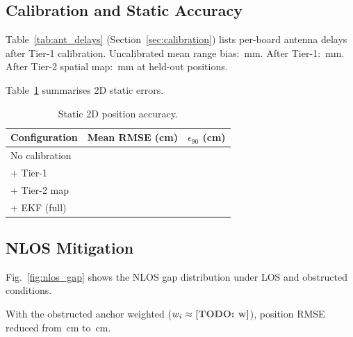 

\subsection{Calibration and Static Accuracy}

Table~\ref{tab:ant_delays} (Section~\ref{sec:calibration}) lists per-board
antenna delays after Tier-1 calibration.
Uncalibrated mean range bias: \,mm.
After Tier-1: \,mm.
After Tier-2 spatial map: \,mm at held-out positions.


Table~\ref{tab:static_accuracy} summarises 2D static errors.

\begin{table}[h]
  \centering
  \caption{Static 2D position accuracy.}
  \label{tab:static_accuracy}
  \begin{tabular}{lcc}
    \toprule
    Configuration & Mean RMSE (cm) & $\epsilon_{90}$ (cm) \\
    \midrule
    No calibration & \todo{} & \todo{} \\
    + Tier-1       & \todo{} & \todo{} \\
    + Tier-2 map   & \todo{} & \todo{} \\
    + EKF (full)   & \todo{} & \todo{} \\
    \bottomrule
  \end{tabular}
\end{table}

\subsection{NLOS Mitigation}

Fig.~\ref{fig:nlos_gap} shows the NLOS gap distribution under LOS and
obstructed conditions.

With the obstructed anchor weighted ($w_i \approx \todo{w}$), position RMSE
reduced from \,cm to \,cm.

